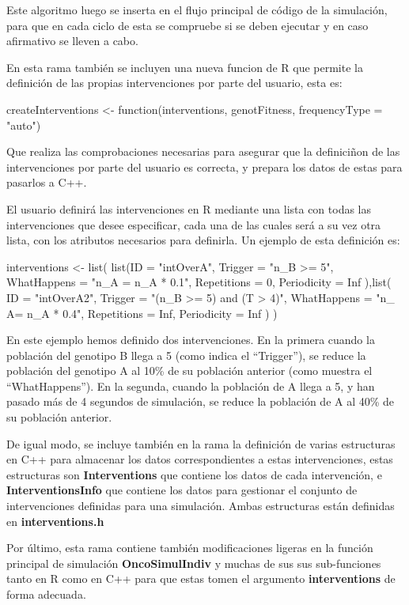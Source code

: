 Este algoritmo luego se inserta en el flujo principal de código de la simulación, para que en cada ciclo de esta se compruebe si se deben ejecutar y en caso afirmativo se lleven a cabo.

En esta rama también se incluyen una nueva funcion de R que permite la definición de las propias intervenciones por parte del usuario, esta es:
\begin{R}
	createInterventions <- function(interventions, genotFitness, frequencyType = "auto")
\end{R}
Que realiza las comprobaciones necesarias para asegurar que la definiciñon de las intervenciones por parte del usuario es correcta, y prepara los datos de estas para pasarlos a C++.

El usuario definirá las intervenciones en R mediante una lista con todas las intervenciones que desee especificar, cada una de las cuales será a su vez otra lista, con los atributos necesarios para definirla. Un ejemplo de esta definición es:
\begin{R}
	interventions <- list(
		list(ID           = "intOverA",
			Trigger       = "n_B >= 5",
			WhatHappens   = "n_A = n_A * 0.1",
			Repetitions   = 0,
			Periodicity   = Inf
		),list(
			ID          = "intOverA2",
			Trigger     = "(n_B >= 5) and (T > 4)",
			WhatHappens = "n_ A= n_A * 0.4",
			Repetitions = Inf,
			Periodicity = Inf
		)   
   	)
\end{R}
En este ejemplo hemos definido dos intervenciones. En la primera cuando la población del genotipo B llega a 5 (como indica el ``Trigger''), se reduce la población del genotipo A al 10\% de su población anterior (como muestra el ``WhatHappens''). En la segunda, cuando la población de A llega a 5, y han pasado más de 4 segundos de simulación, se reduce la población de A al 40\% de su población anterior.

De igual modo, se incluye también en la rama la definición de varias estructuras en C++ para almacenar los datos correspondientes a estas intervenciones, estas estructuras son \textbf{Interventions} que contiene los datos de cada intervención, e \textbf{InterventionsInfo} que contiene los datos para gestionar el conjunto de intervenciones definidas para una simulación. Ambas estructuras están definidas en \textbf{interventions.h}

Por último, esta rama contiene también modificaciones ligeras en la función principal de simulación \textbf{OncoSimulIndiv} y muchas de sus sus sub-funciones tanto en R como en C++ para que estas tomen el argumento \textbf{interventions} de forma adecuada.


